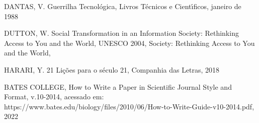 \documentclass[
12pt,		%
openright,	%
twoside,  %
a4paper,			%
chapter=TITLE,		%
english,			%
french,				%
spanish,			%
brazil				%
]{USPSC-classe/USPSC}
\begin{document}
\begin{flushleft}
\begin{flushleft}
\begin{flushleft}
\begin{flushleft}
[DANTAS, 1988] DANTAS, V. Guerrilha Tecnol\'ogica, Livros T\'ecnicos e Cient\'{\i}ficos, janeiro de 1988
\end{flushleft}


\end{flushleft}


\end{flushleft}


\end{flushleft}


\begin{flushleft}
\begin{flushleft}
\begin{flushleft}
\begin{flushleft}
[DUTTON, 2004] DUTTON, W. Social Transformation in an Information Society: Rethinking Access to You and the World, UNESCO 2004, Society: Rethinking Access to You and the World, 
\end{flushleft}


\end{flushleft}


\end{flushleft}


\end{flushleft}


\begin{flushleft}
\begin{flushleft}
\begin{flushleft}
\begin{flushleft}
[HARARI, 2018]  HARARI, Y. 21 Li\c{c}\~oes para o s\'eculo 21, Companhia das Letras, 2018
\end{flushleft}


\end{flushleft}


\end{flushleft}


\end{flushleft}


\begin{flushleft}
\begin{flushleft}
\begin{flushleft}
\begin{flushleft}
[BATES, 2014] BATES COLLEGE, How to Write a Paper in Scientific Journal Style and Format, v.10-2014, acessado em: https://www.bates.edu/biology/files/2010/06/How-to-Write-Guide-v10-2014.pdf, 2022
\end{flushleft}


\end{flushleft}


\end{flushleft}


\end{flushleft}
\end{document}
